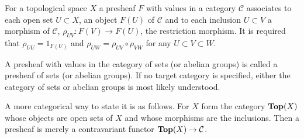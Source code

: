 \documentclass[12pt]{article}
\begin{document}
For a topological space $X$ a presheaf $F$ with values in a category $\mathcal{C}$ associates to each open set $U\subset X$, an object $F(U)$ of $\mathcal{C}$ and to each inclusion $U\subset V$ a morphism of $\mathcal{C}$, $\rho_{UV} : F(V)\to F(U)$, the restriction morphism.  It is required that $\rho_{UU} = 1_{F(U)}$ and $\rho_{UW} = \rho_{UV}\circ \rho_{VW}$ for any $U\subset V\subset W$.

A presheaf with values in the category of sets (or abelian groups) is called a presheaf of sets (or abelian groups).  If no target category is specified, either the category of sets or abelian groups is most likely understood.

A more categorical way to state it is as follows.  For $X$ form the category ${\bf Top}(X)$ whose objects are open sets of $X$ and whose morphisms are the inclusions.  Then a presheaf is merely a contravariant functor ${\bf Top}(X)\to\mathcal{C}$.
\end{document}
